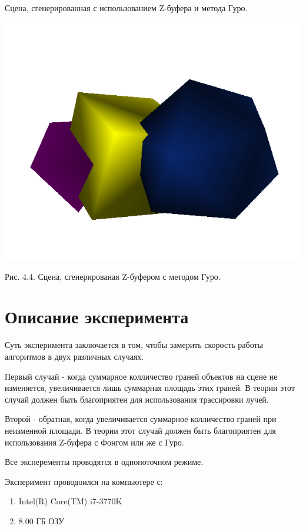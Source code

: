 \documentclass[12pt]{report}
\begin{document}
	Сцена, сгенерированная с использованием Z-буфера и метода Гуро.

	\begin{center}
		\includegraphics[scale=0.8]{zg.png}
		
		Рис. 4.4. Сцена, сгенерированая Z-буфером с методом Гуро.
	\end{center}

	\section{Описание эксперимента}
	
	Суть эксперимента заключается в том, чтобы замерить скорость работы алгоритмов в 
	двух различных случаях.
	
	Первый случай - когда суммарное колличество граней объектов на сцене не изменяется, увеличивается лишь суммарная площадь этих граней. В теории этот случай должен быть благоприятен для использования трассировки лучей.
	
	Второй - обратная, когда увеличивается суммарное колличество граней при неизменной площади. В теории этот случай должен быть благоприятен для использования Z-буфера с Фонгом или же с Гуро.
	
	Все эксперементы проводятся в однопоточном режиме.
	
	Эксперимент проводоился на компьютере с:
	\begin{enumerate}
		\item Intel(R) Core(TM) i7-3770K
		\item 8.00 ГБ ОЗУ
	\end{enumerate}
\end{document}
